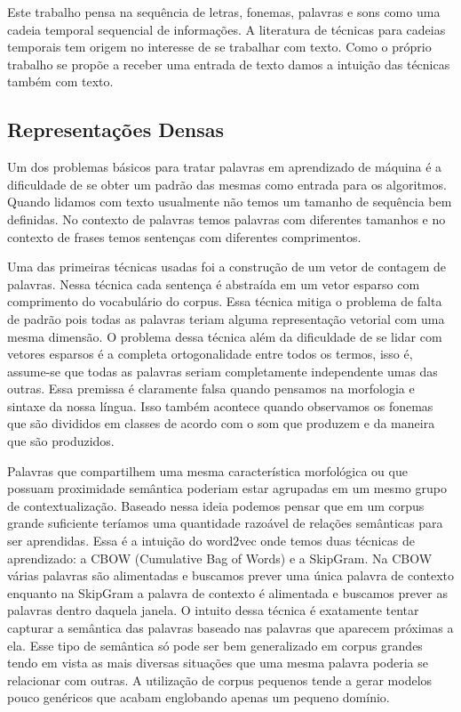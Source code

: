 Este trabalho pensa na sequência de letras, fonemas, palavras e sons como uma cadeia temporal sequencial de informações. A literatura de técnicas para cadeias temporais tem origem no interesse de se trabalhar com texto. Como o próprio trabalho se propõe a receber uma entrada de texto damos a intuição das técnicas também com texto.

\subsection{Representações Densas}
Um dos problemas básicos para tratar palavras em aprendizado de máquina é a dificuldade de se obter um padrão das mesmas como entrada para os algoritmos. Quando lidamos com texto usualmente não temos um tamanho de sequência bem definidas. No contexto de palavras temos palavras com diferentes tamanhos e no contexto de frases temos sentenças com diferentes comprimentos. 

Uma das primeiras técnicas usadas foi a construção de um vetor de contagem de palavras. Nessa técnica cada sentença é abstraída em um vetor esparso com comprimento do vocabulário do corpus. Essa técnica mitiga o problema de falta de padrão pois todas as palavras teriam alguma representação vetorial com uma mesma dimensão. O problema dessa técnica além da dificuldade de se lidar com vetores esparsos é a completa ortogonalidade entre todos os termos, isso é, assume-se que todas as palavras seriam completamente independente umas das outras. Essa premissa é claramente falsa quando pensamos na morfologia e sintaxe da nossa língua. Isso também acontece quando observamos os fonemas que são divididos em classes de acordo com o som que produzem e da maneira que são produzidos.

Palavras que compartilhem uma mesma característica morfológica ou que possuam proximidade semântica poderiam estar agrupadas em um mesmo grupo de contextualização. Baseado nessa ideia podemos pensar que em um corpus grande suficiente teríamos uma quantidade razoável de relações semânticas para ser aprendidas. Essa é a intuição do word2vec \cite{word2vec:DBLP:journals/corr/MikolovSCCD13} onde temos duas técnicas de aprendizado: a CBOW (Cumulative Bag of Words) e a SkipGram. Na CBOW várias palavras são alimentadas e buscamos prever uma única palavra de contexto enquanto na SkipGram a palavra de contexto é alimentada e buscamos prever as palavras dentro daquela janela. O intuito dessa técnica é exatamente tentar capturar a semântica das palavras baseado nas palavras que aparecem próximas a ela. Esse tipo de semântica só pode ser bem generalizado em corpus grandes tendo em vista as mais diversas situações que uma mesma palavra poderia se relacionar com outras. A utilização de corpus pequenos tende a gerar modelos pouco genéricos que acabam englobando apenas um pequeno domínio. 

